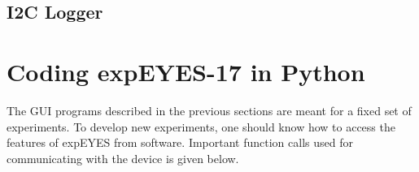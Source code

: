 \documentclass[a4paper,12pt,english]{sphinxmanual}
\begin{document}
\section{I2C Logger}
\label{\detokenize{8.4:i2c-logger}}\label{\detokenize{8.4::doc}}

\chapter{Coding expEYES-17 in Python}
\label{\detokenize{index:coding-expeyes-17-in-python}}
The GUI programs described in the previous sections are meant for a
fixed set of experiments. To develop new experiments, one should know
how to access the features of expEYES from software. Important function
calls used for communicating with the device is given below.



\renewcommand{\indexname}{Index}
\printindex
\end{document}
